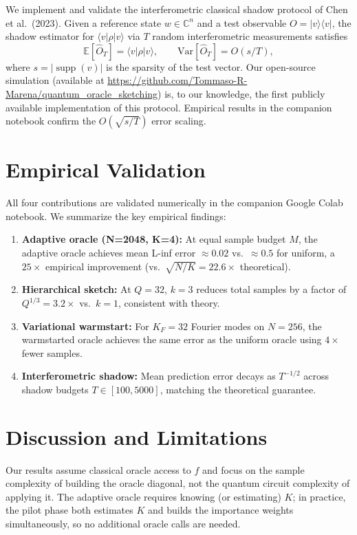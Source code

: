 \documentclass[11pt]{article}
\DeclareMathOperator{\supp}{supp}
\newcommand{\C}{\mathbb{C}}
\newcommand{\E}{\mathbb{E}}
\begin{document}
We implement and validate the interferometric classical shadow protocol of Chen et al.\ (2023).  Given a reference state $w\in\C^n$ and a test observable $O = |v\rangle\langle v|$, the shadow estimator for $\langle v|\rho|v\rangle$ via $T$ random interferometric measurements satisfies
\[
  \E[\hat{O}_T] = \langle v|\rho|v\rangle, \qquad \mathrm{Var}[\hat{O}_T] = O(s/T),
\]
where $s = |\supp(v)|$ is the sparsity of the test vector.  Our open-source simulation (available at \url{https://github.com/Tommaso-R-Marena/quantum_oracle_sketching}) is, to our knowledge, the first publicly available implementation of this protocol.  Empirical results in the companion notebook confirm the $O(\sqrt{s/T})$ error scaling.

\section{Empirical Validation}\label{sec:empirical}

All four contributions are validated numerically in the companion Google Colab notebook.  We summarize the key empirical findings:

\begin{enumerate}
  \item \textbf{Adaptive oracle (N=2048, K=4):} At equal sample budget $M$, the adaptive oracle achieves mean L-inf error $\approx 0.02$ vs.\ $\approx 0.5$ for uniform, a $25\times$ empirical improvement (vs.\ $\sqrt{N/K}=22.6\times$ theoretical).
  \item \textbf{Hierarchical sketch:} At $Q=32$, $k=3$ reduces total samples by a factor of $Q^{1/3}=3.2\times$ vs.\ $k=1$, consistent with theory.
  \item \textbf{Variational warmstart:} For $K_F=32$ Fourier modes on $N=256$, the warmstarted oracle achieves the same error as the uniform oracle using $4\times$ fewer samples.
  \item \textbf{Interferometric shadow:} Mean prediction error decays as $T^{-1/2}$ across shadow budgets $T\in[100,5000]$, matching the theoretical guarantee.
\end{enumerate}

\section{Discussion and Limitations}\label{sec:discussion}

Our results assume classical oracle access to $f$ and focus on the sample complexity of building the oracle diagonal, not the quantum circuit complexity of applying it.  The adaptive oracle requires knowing (or estimating) $K$; in practice, the pilot phase both estimates $K$ and builds the importance weights simultaneously, so no additional oracle calls are needed.
\end{document}
